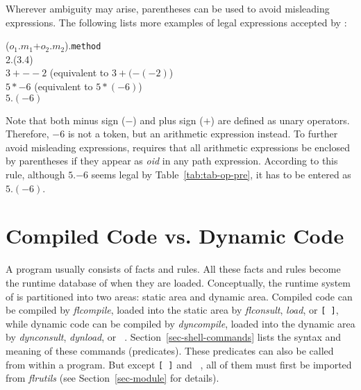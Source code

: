 \documentclass[11pt]{report}
\begin{document}
Wherever ambiguity may arise, parentheses can be used to avoid misleading expressions. The
following lists more examples of legal expressions accepted by \FLORA:
\begin{qrules}
($o_1$.$m_1$+$o_2$.$m_2$).{\tt method} \\
2.(3.4) \\
$3+--2$ (equivalent to $3+(-(-2)$) \\
$5*-6$ (equivalent to $5*(-6)$) \\
$5.(-6)$
\end{qrules}

Note that both minus sign ($-$) and plus sign ($+$) are defined as unary operators. Therefore,
$-6$ is not a token, but an arithmetic expression instead. To further avoid misleading
expressions, \FLORA requires that all arithmetic expressions be enclosed by parentheses if
they appear as {\it oid} in any path expression. According to this rule, although $5.$$-6$
seems legal by Table~\ref{tab:tab-op-pre}, it has to be entered as $5.(-6)$.

\section{Compiled Code vs. Dynamic Code}

A \FLORA program usually consists of facts and rules. All these facts and rules become the
runtime database of \FLORA when they are loaded. Conceptually, the runtime system of \FLORA
is partitioned into two areas: static area and dynamic area. Compiled code can be compiled by
\emph{flcompile}, loaded into the static area by \emph{flconsult}, \emph{load}, or {\tt [~]},
while dynamic code can be compiled by \emph{dyncompile}, loaded into the dynamic area by
\emph{dynconsult}, \emph{dynload}, or \texttt{~}.
Section~\ref{sec-shell-commands} lists the syntax and meaning of these commands (predicates).
These predicates can also be called from within a \FLORA program. But except {\tt [~]} and
\texttt{~}, all of them must first be imported from \emph{flrutils}
(see Section~\ref{sec-module} for details).
\end{document}
